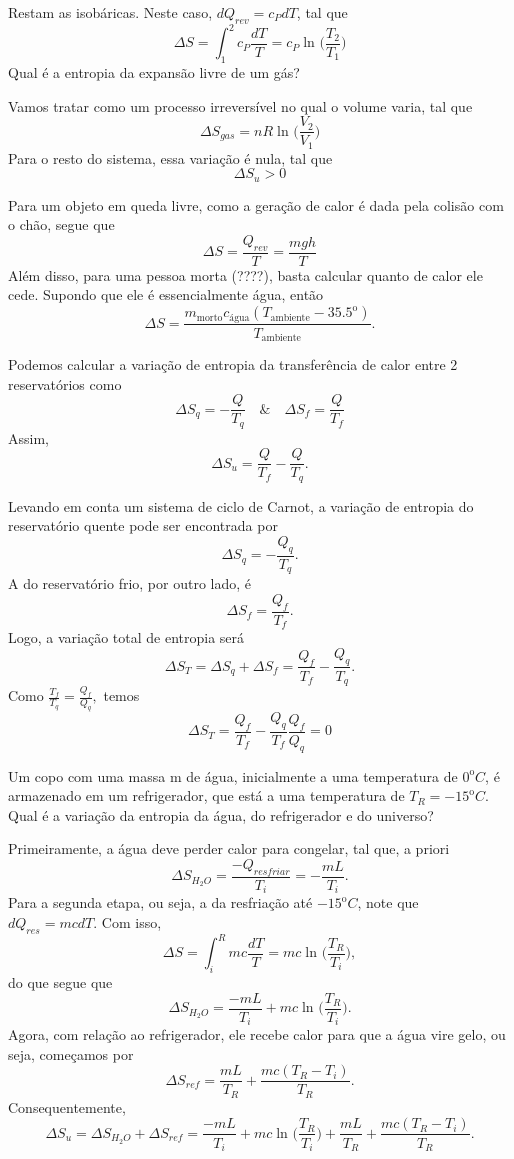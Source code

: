 \documentclass[phsyicsII_notes.tex]{subfiles}
\begin{document}
Restam as isobáricas. Neste caso, \(dQ_{rev} = c_{P}dT\), tal que
\[
	\Delta S = \int_{1}^{2} c_{P}\frac{dT}{T} = c_{P}\ln^{}{\biggl(\frac{T_{2}}{T_{1}}\biggr)}
\]
Qual é a entropia da expansão livre de um gás?

Vamos tratar como um processo irreversível no qual o volume varia, tal que
\[
	\Delta S_{gas} = nR\ln^{}{\biggl(\frac{V_{2}}{V_{1}}\biggr)}
\]
Para o resto do sistema, essa variação é nula, tal que
\[
	\Delta S_{u} > 0
\]
\begin{example}
	Para um objeto em queda livre, como a geração de calor é dada pela colisão com o chão, segue que
	\[
		\Delta S = \frac{Q_{rev}}{T} = \frac{mgh}{T}
	\]
	Além disso, para uma pessoa morta (????), basta calcular quanto de calor ele cede. Supondo que ele é essencialmente
	água, então
	\[
		\Delta S = \frac{m_{\text{morto}}c_{\text{água}}(T_{\text{ambiente}}-35.5^{\mathrm{o}})}{T_{\text{ambiente}}}.
	\]
\end{example}
\begin{example}
	Podemos calcular a variação de entropia da transferência de calor entre 2 reservatórios como
	\[
		\Delta S_{q} = -\frac{Q}{T_{q}}\quad\&\quad \Delta S_{f} = \frac{Q}{T_{f}}
	\]
	Assim,
	\[
		\Delta S_{u} = \frac{Q}{T_{f}} - \frac{Q}{T_{q}}.
	\]
\end{example}
Levando em conta um sistema de ciclo de Carnot, a variação de entropia do reservatório quente pode ser encontrada por
\[
	\Delta S_{q} = -\frac{Q_{q}}{T_{q}}.
\]
A do reservatório frio, por outro lado, é
\[
	\Delta S_{f} = \frac{Q_{f}}{T_{f}}.
\]
Logo, a variação total de entropia será
\[
	\Delta S_{T} = \Delta S_{q} + \Delta S_{f} = \frac{Q_{f}}{T_{f}} - \frac{Q_{q}}{T_{q}}.
\]
Como \(\frac{T_{f}}{T_{q}} = \frac{Q_{f}}{Q_{q}},\) temos
\[
	\Delta S_{T} = \frac{Q_{f}}{T_{f}} - \frac{Q_{q}}{T_{f}}\frac{Q_{f}}{Q_{q}} = 0
\]
\begin{example}
	Um copo com uma massa m de água, inicialmente a uma temperatura de \({0}^{\mathrm{o}}C\), é armazenado em um refrigerador, que está a uma temperatura
	de \(T_{R}={-15}^{\mathrm{o}}C\). Qual é a variação da entropia da água, do refrigerador e do universo?

	Primeiramente, a água deve perder calor para congelar, tal que, a priori
	\[
		\Delta S_{H_{2}O} = \frac{-Q_{resfriar}}{T_{i}} = -\frac{mL}{T_{i}}.
	\]
	Para a segunda etapa, ou seja, a da resfriação até \({-15}^{\mathrm{o}}C\), note que \(dQ_{res} = mcdT.\) Com isso,
	\[
		\Delta S = \int_{i}^{R}mc \frac{dT}{T} = mc \ln^{}{\biggl(\frac{T_{R}}{T_{i}}\biggr)},
	\]
	do que segue que
	\[
		\Delta S_{H_{2}O} = \frac{-mL}{T_{i}} + mc\ln^{}{\biggl(\frac{T_{R}}{T_{i}}\biggr)}.
	\]
	Agora, com relação ao refrigerador, ele recebe calor para que a água vire gelo, ou seja, começamos por
	\[
		\Delta S_{ref} = \frac{mL}{T_{R}} + \frac{mc(T_{R}-T_{i})}{T_{R}}.
	\]
	Consequentemente,
	\[
		\Delta S_{u} = \Delta S_{H_{2}O} + \Delta S_{ref} = \frac{-mL}{T_{i}} + mc\ln^{}{\biggl(\frac{T_{R}}{T_{i}}\biggr)} + \frac{mL}{T_{R}} + \frac{mc(T_{R}-T_{i})}{T_{R}}.
	\]
\end{example}
\end{document}
